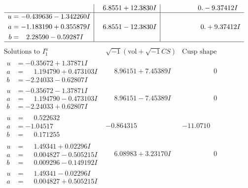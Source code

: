 \documentclass[1p]{elsarticle_modified}
\theoremstyle{definition}
\newcommand{\I}{\sqrt{-1}}
\begin{document}
$$\begin{array}{c|c|c}
 & \phantom{-}6.8551 + 12.3830 I & \phantom{-0.000000 } 0. - 9.37412 I \\ \hline\begin{aligned}
u &= -0.439636 - 1.342260 I \\
a &= -1.183190 + 0.355879 I \\
b &= \phantom{-}2.28590 - 0.59287 I\end{aligned}
 & \phantom{-}6.8551 - 12.3830 I & \phantom{-0.000000 -}0. + 9.37412 I\\
 \hline 
 \end{array}$$\newpage$$\begin{array}{c|c|c}  
\text{Solutions to }I^u_{1}& \I (\text{vol} + \sqrt{-1}CS) & \text{Cusp shape}\\
 \hline 
\begin{aligned}
u &= -0.35672 + 1.37871 I \\
a &= \phantom{-}1.194790 + 0.473103 I \\
b &= -2.24033 - 0.62807 I\end{aligned}
 & \phantom{-}8.96151 + 7.45389 I & \phantom{-0.000000 } 0 \\ \hline\begin{aligned}
u &= -0.35672 - 1.37871 I \\
a &= \phantom{-}1.194790 - 0.473103 I \\
b &= -2.24033 + 0.62807 I\end{aligned}
 & \phantom{-}8.96151 - 7.45389 I & \phantom{-0.000000 } 0 \\ \hline\begin{aligned}
u &= \phantom{-}0.522632\phantom{ +0.000000I} \\
a &= -1.04517\phantom{ +0.000000I} \\
b &= \phantom{-}0.171255\phantom{ +0.000000I}\end{aligned}
 & -0.864315\phantom{ +0.000000I} & -11.0710\phantom{ +0.000000I} \\ \hline\begin{aligned}
u &= \phantom{-}1.49341 + 0.02296 I \\
a &= \phantom{-}0.004827 - 0.505215 I \\
b &= \phantom{-}0.009296 - 0.149192 I\end{aligned}
 & \phantom{-}6.08983 + 3.23170 I & \phantom{-0.000000 } 0 \\ \hline\begin{aligned}
u &= \phantom{-}1.49341 - 0.02296 I \\
a &= \phantom{-}0.004827 + 0.505215 I \\

\end{aligned}
\end{array}$$
\end{document}
